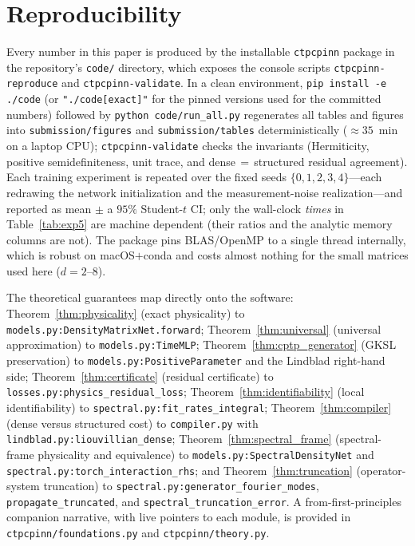 \documentclass[twocolumn,aps,prxquantum,superscriptaddress,nofootinbib,floatfix,longbibliography]{revtex4-2}
\begin{document}
\section{Reproducibility}
\label{sec:reproducibility}
Every number in this paper is produced by the installable \texttt{ctpcpinn} package in the repository's \texttt{code/} directory, which exposes the console scripts \texttt{ctpcpinn-reproduce} and \texttt{ctpcpinn-validate}. In a clean environment, \texttt{pip install -e ./code} (or \texttt{"./code[exact]"} for the pinned versions used for the committed numbers) followed by \texttt{python code/run\_all.py} regenerates all tables and figures into \texttt{submission/figures} and \texttt{submission/tables} deterministically ($\approx35$~min on a laptop CPU); \texttt{ctpcpinn-validate} checks the invariants (Hermiticity, positive semidefiniteness, unit trace, and dense$\,=\,$structured residual agreement). Each training experiment is repeated over the fixed seeds $\{0,1,2,3,4\}$---each redrawing the network initialization and the measurement-noise realization---and reported as mean $\pm$ a $95\%$ Student-$t$ CI; only the wall-clock \emph{times} in Table~\ref{tab:exp5} are machine dependent (their ratios and the analytic memory columns are not). The package pins BLAS/OpenMP to a single thread internally, which is robust on macOS$+$conda and costs almost nothing for the small matrices used here ($d=2$--$8$).

The theoretical guarantees map directly onto the software: Theorem~\ref{thm:physicality} (exact physicality) to \texttt{models.py:DensityMatrixNet.forward}; Theorem~\ref{thm:universal} (universal approximation) to \texttt{models.py:TimeMLP}; Theorem~\ref{thm:cptp_generator} (GKSL preservation) to \texttt{models.py:PositiveParameter} and the Lindblad right-hand side; Theorem~\ref{thm:certificate} (residual certificate) to \texttt{losses.py:physics\_residual\_loss}; Theorem~\ref{thm:identifiability} (local identifiability) to \texttt{spectral.py:fit\_rates\_integral}; Theorem~\ref{thm:compiler} (dense versus structured cost) to \texttt{compiler.py} with \texttt{lindblad.py:liouvillian\_dense}; Theorem~\ref{thm:spectral_frame} (spectral-frame physicality and equivalence) to \texttt{models.py:SpectralDensityNet} and \texttt{spectral.py:torch\_interaction\_rhs}; and Theorem~\ref{thm:truncation} (operator-system truncation) to \texttt{spectral.py:generator\_fourier\_modes}, \texttt{propagate\_truncated}, and \texttt{spectral\_truncation\_error}. A from-first-principles companion narrative, with live pointers to each module, is provided in \texttt{ctpcpinn/foundations.py} and \texttt{ctpcpinn/theory.py}.
\end{document}
